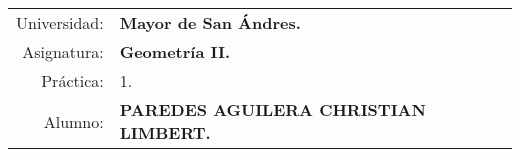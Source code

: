 \begin{tabular}{r l }
Universidad: & \textbf{Mayor de San Ándres.}\\
Asignatura: & \textbf{Geometría II.}\\
Práctica: & 1.\\ 
Alumno: & \textbf{PAREDES AGUILERA CHRISTIAN LIMBERT.}
\end{tabular}
\begin{flushleft}
\end{flushleft}
\vspace{.2cm}
